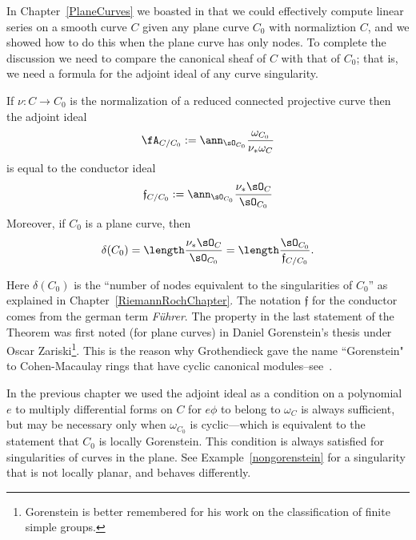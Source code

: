 In Chapter~\ref{PlaneCurves} we boasted in that we could effectively compute
linear series on a smooth curve $C$ given any plane curve $C_0$ with normaliztion $C$, 
and we showed how to do this when the plane curve has only nodes. To complete the discussion 
we need to compare the canonical sheaf of $C$ with
that of $C_0$; that is, we need a formula for the adjoint ideal of any curve singularity.



\begin{theorem}\label{general adjoint}
If $\nu: C \to C_0$ is the normalization of a reduced connected projective curve then the 
adjoint ideal 
$$
\fA_{C/C_0} :=\ann_{\sO_{C_0}}\frac{\omega_{C_0}}{\nu_* \omega_C}
$$
is equal to the conductor ideal
$$
\mathfrak f_{C/C_0}: = \ann_{\sO_{C_0}}\frac{\nu_* \sO_C}{\sO_{C_0}}	
$$
Moreover, if $C_0$ is a plane curve, then 
$$
\delta(C_0) = \length \frac{\nu_* \sO_C}{\sO_{C_0}} = \length \frac {\sO_{C_0}}{\mathfrak f_{C/C_0}}.
$$
\end{theorem}

Here $\delta(C_0)$ is the ``number of nodes equivalent to the singularities of $C_0$'' as
explained in Chapter~\ref{RiemannRochChapter}. The notation $\mathfrak f$ for the conductor comes from the german term \emph{F\"uhrer}. The property in the last statement of the
Theorem  was first noted (for plane curves) in Daniel Gorenstein's thesis under Oscar Zariski\footnote{Gorenstein is better remembered for his work on the classification of finite simple groups.}. This is the
reason why Grothendieck gave the name ``Gorenstein" to Cohen-Macaulay rings that have cyclic canonical 
modules--see~\cite{Bass}. 

In the previous chapter we used the adjoint ideal as a condition on a polynomial
$e$ to multiply differential forms on $C$ for $e\phi$ to belong to $\omega_C$ is always sufficient, but may be necessary only
when $\omega_{C_0}$ is cyclic---which is equivalent to the statement that $C_0$ is locally
Gorenstein. This condition is always satisfied for singularities of curves in the plane.
See Example~\ref{nongorenstein} for a singularity that is not locally planar, and behaves differently.


